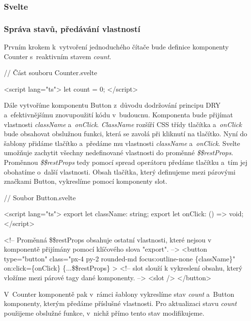 \subsubsection{Svelte}

\subsubsection*{Správa stavů, předávání vlastností}

Prvním krokem k~vytvoření jednoduchého čítače bude definice komponenty Counter s~reaktivním stavem \emph{count}.

\begin{prog}
// Část souboru Counter.svelte

<script lang="ts">
  let count = 0;
</script>
\end{prog}

Dále vytvoříme komponentu Button z~důvodu dodržování principu DRY a~efektivnějšímu znovupoužití kódu v~budoucnu.
Komponenta bude přijímat vlastnosti \emph{className} a~\emph{onClick}. \emph{ClassName} rozšíří CSS třídy tlačítka a~\emph{onClick} bude obsahovat obslužnou funkci, která se zavolá při kliknutí na tlačítko.
Nyní do šablony přidáme tlačítko a~předáme mu vlastnosti \emph{className} a~\emph{onClick}.
Svelte umožňuje zachytit všechny nedefinované vlastnosti do proměnné \emph{\$\$restProps}. Proměnnou \emph{\$\$restProps} tedy pomocí spread operátoru předáme tlačítku a~tím jej obohatíme o~další vlastnosti. 
Obsah tlačítka, který definujeme mezi párovými značkami Button, vykreslíme pomocí komponenty slot.

\begin{prog}
// Soubor Button.svelte

<script lang="ts">
  export let className: string;
  export let onClick: () => void;
</script>

<!-- Proměnná \$\$restProps obsahuje ostatní vlastnosti, 
  které nejsou v komponentě přijímány pomocí klíčového slova "export". -->
<button
  type="button"
  class="px-4 py-2 rounded-md focus:outline-none \{className\}"
  on:click=\{onClick\}
  \{...\$\$restProps\}
>
  <!-- slot slouží k vykreslení obsahu, 
    který vložíme mezi párové tagy dané komponenty. -->
  <slot />
</button>
\end{prog}

V~Counter komponentě pak v~rámci šablony vykreslíme stav \emph{count} a~Button komponenty, kterým předáme příslušné vlastnosti. 
Pro aktualizaci stavu \emph{count} použijeme obslužné funkce, v~nichž přímo tento stav modifikujeme.

